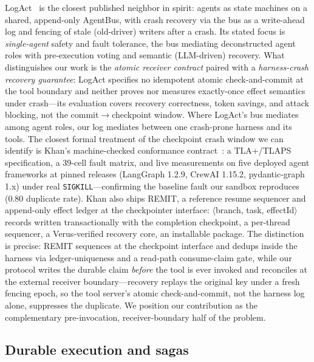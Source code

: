 \documentclass[10pt,journal,compsoc]{IEEEtran}
\begin{document}
LogAct~\cite{logact2026} is the closest published neighbor in
spirit: agents as state machines on a shared, append-only
AgentBus, with crash recovery via the bus as a write-ahead log
and fencing of stale (old-driver) writers after a crash. Its
stated focus is \emph{single-agent} safety and fault tolerance,
the bus mediating deconstructed agent roles with pre-execution
voting and semantic (LLM-driven) recovery. What distinguishes
our work is the \emph{atomic receiver contract} paired with a
\emph{harness-crash recovery guarantee}: LogAct specifies no
idempotent atomic check-and-commit at the tool boundary and
neither proves nor measures exactly-once effect semantics under
crash---its evaluation covers recovery correctness, token
savings, and attack blocking, not the commit$\to$checkpoint
window. Where LogAct's bus mediates among agent roles, our log
mediates between one crash-prone harness and its tools. The
closest formal treatment of the checkpoint crash window we can
identify is Khan's machine-checked conformance
contract~\cite{khan2026resume}: a TLA+/TLAPS specification, a
39-cell fault matrix, and live measurements on five deployed
agent frameworks at pinned releases (LangGraph 1.2.9, CrewAI
1.15.2, pydantic-graph 1.x) under real \texttt{SIGKILL}---confirming
the baseline fault our sandbox reproduces (0.80 duplicate rate).
Khan also ships REMIT, a reference resume sequencer and
append-only effect ledger at the checkpointer interface:
$\langle$branch, task, effectId$\rangle$ records written
transactionally with the completion checkpoint, a per-thread
sequencer, a Verus-verified recovery core, an installable
package. The distinction is precise: REMIT sequences at the
checkpoint interface and dedups inside the harness via
ledger-uniqueness and a read-path consume-claim gate, while our
protocol writes the durable claim \emph{before} the tool is ever
invoked and reconciles at the external receiver boundary---recovery
replays the original key under a fresh fencing epoch, so the
tool server's atomic check-and-commit, not the harness log
alone, suppresses the duplicate. We position our contribution
as the complementary pre-invocation, receiver-boundary half of
the problem.

\subsection{Durable execution and sagas}
\end{document}
